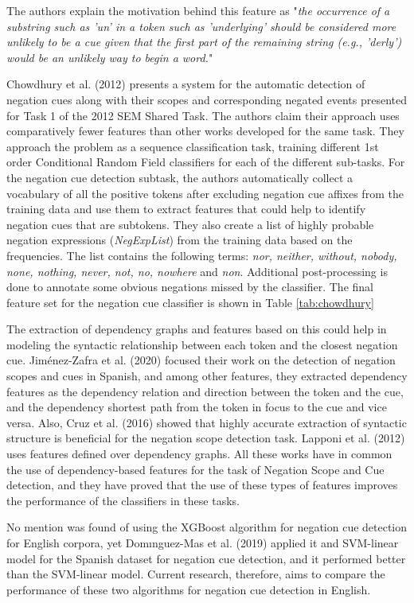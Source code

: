 The authors explain the motivation behind this feature as "\textit{the occurrence of a substring such as 'un' in a token such as 'underlying' should be considered more unlikely to be a cue given that the first part of the remaining string (e.g., 'derly') would be an unlikely way to begin a word.}"

Chowdhury et al. (2012) \cite{chowdhury2012fbk} presents a system for the automatic detection of negation cues along with their scopes and corresponding negated events presented for Task 1 of the 2012 SEM Shared Task. The authors claim their approach uses comparatively fewer features than other works developed for the same task. They approach the problem as a sequence classification task, training different 1st order Conditional Random Field classifiers for each of the different sub-tasks. 
For the negation cue detection subtask, the authors automatically collect a vocabulary of all the positive tokens after excluding negation cue affixes from the training data and use them to extract features that could help to identify negation cues that are subtokens. They also create a list of highly probable negation expressions (\textit{NegExpList}) from the training data based on the frequencies. The list contains the following terms: \textit{nor, neither, without, nobody, none, nothing, never, not, no, nowhere} and  \textit{non}. Additional post-processing is done to annotate some obvious negations missed by the classifier. The final feature set for the negation cue classifier is shown in Table \ref{tab:chowdhury}

The extraction of dependency graphs and features based on this could help in modeling the syntactic relationship between each token and the closest negation cue. Jiménez-Zafra et al. (2020) \cite{jimenez2020detecting} focused their work on the detection of negation scopes and cues in Spanish, and among other features, they extracted dependency features as the dependency relation and direction between the token and the cue, and the dependency shortest path from the token in focus to the cue and vice versa. Also, Cruz et al. (2016) \cite{cruz2016machine} showed that highly accurate extraction of syntactic structure is beneficial for the negation scope detection task. Lapponi et al. (2012) \cite{lapponi2012uio} uses features defined over dependency graphs. All these works have in common the use of dependency-based features for the task of Negation Scope and Cue detection, and they have proved that the use of these types of features improves the performance of the classifiers in these tasks.

No mention was found of using the XGBoost algorithm for negation cue detection for English corpora, yet Domınguez-Mas et al. (2019) \cite{xgb2019} applied it and SVM-linear model for the Spanish dataset for negation cue detection, and it performed better than the SVM-linear model. Current research, therefore, aims to compare the performance of these two algorithms for negation cue detection in English.
